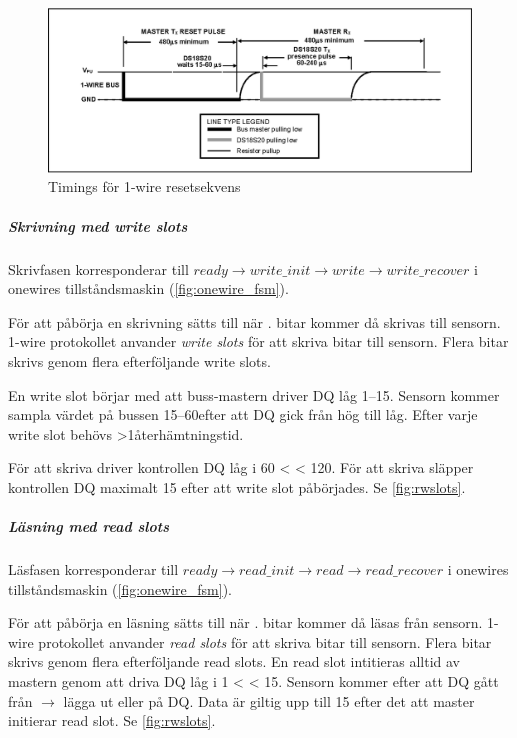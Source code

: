 \begin{figure}[H]
	\centering
	\includegraphics[width=\textwidth]{reset_presence.eps}
	\caption{Timings för 1-wire resetsekvens}
	\label{fig:ow_timings}
\end{figure}


\subparagraph{Skrivning med \emph{write slots}}
Skrivfasen korresponderar till $ready\rightarrow write\_init\rightarrow write\rightarrow write\_recover$ i onewires tillståndsmaskin (\autoref{fig:onewire_fsm}).

För att påbörja en skrivning sätts  till  när .
 bitar kommer då skrivas till sensorn.
1-wire protokollet anvander \emph{write slots} för att skriva bitar till sensorn. Flera bitar skrivs genom flera efterföljande write slots.

En write slot börjar med att buss-mastern driver DQ låg 1--15\us. Sensorn kommer sampla värdet på bussen 15--60\us efter att DQ gick från hög till låg. Efter varje write slot behövs >1\us återhämtningstid.

För att skriva \low{} driver kontrollen DQ låg i 60\us{} < \Tx{} < 120\us{}.
För att skriva \high{} släpper kontrollen DQ maximalt 15\us{} efter att write slot påbörjades.
Se \autoref{fig:rwslots}.


\subparagraph{Läsning med \emph{read slots}}
Läsfasen korresponderar till $ready\rightarrow read\_init\rightarrow read\rightarrow read\_recover$ i onewires tillståndsmaskin (\autoref{fig:onewire_fsm}).

För att påbörja en läsning sätts  till  när .
 bitar kommer då läsas från sensorn.
1-wire protokollet anvander \emph{read slots} för att skriva bitar till sensorn. Flera bitar skrivs genom flera efterföljande read slots.
En read slot intitieras alltid av mastern genom att driva DQ låg i 1\us{} < \Tx{} < 15\us{}. Sensorn kommer efter att DQ gått från \high{} $\rightarrow$ \low{} lägga ut \high{} eller \low{} på DQ. Data är giltig upp till 15\us{} efter det att master initierar read slot.
Se \autoref{fig:rwslots}.



